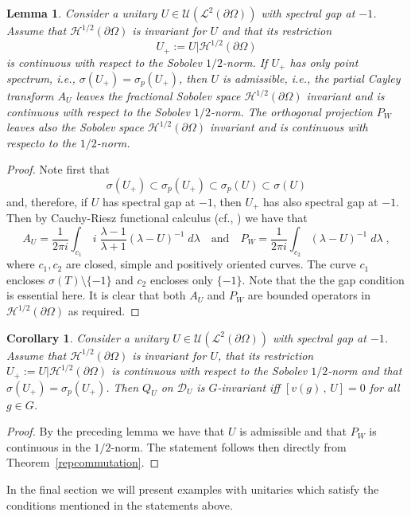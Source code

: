 \documentclass[a4paper,12pt]{amsart}
\renewcommand{\H}{\mathcal{H}}
\renewcommand{\L}{\mathcal{L}}
\newcommand{\D}{\mathcal{D}}
\newcommand{\pO}{{\partial \Omega}}
\newcommand{\1}{\mathbb{I}}
\newtheorem{corollary}[theorem]{Corollary}
\newtheorem{lemma}[theorem]{Lemma}
\numberwithin{equation}{section}
\numberwithin{theorem}{section}
\begin{document}
\begin{lemma}\label{lem:2}
Consider a unitary $U\in\mathcal{U}(\L^2(\pO))$ with spectral gap at $-1$. Assume that 
$\H^{1/2}(\pO)$ is invariant for $U$ and that its restriction
\[
 U_+:=U|\H^{1/2}(\pO)
\]
is continuous with respect to the Sobolev $1/2$-norm. If $U_+$ has only point spectrum, 
i.e., $\sigma(U_+)=\sigma_p(U_+)$, then $U$ is admissible, i.e., the partial Cayley transform
$A_U$ leaves the fractional Sobolev space $\H^{1/2}(\pO)$ invariant and is continuous with respect to the Sobolev $1/2$-norm.
The orthogonal projection $P_W$ leaves also the Sobolev space $\H^{1/2}(\pO)$ invariant and is continuous 
with respecto to the $1/2$-norm.
\end{lemma}
\begin{proof}
Note first that
\[
 \sigma(U_+)\subset\sigma_p(U_+)\subset\sigma_p(U)\subset \sigma(U)
\]
and, therefore, if $U$ has spectral gap at $-1$, then $U_+$ has also spectral gap at $-1$.
Then by Cauchy-Riesz functional calculus (cf., \cite[Chapter~VII]{DunfordI}) we have
that
\[
 A_U=\frac{1}{2\pi i}\int_{c_1}\,i\;\frac{\lambda-1}{\lambda+1}\left(\lambda-U\right)^{-1}\; d\lambda
 \quad\mathrm{and}\quad
 P_W=\frac{1}{2\pi i}\int_{c_2}\left(\lambda-U\right)^{-1}\; d\lambda\;,
\]
where $c_1, c_2$ are closed, simple and positively oriented curves. The curve $c_1$ encloses $\sigma(T)\setminus\{-1\}$ and
$c_2$ encloses only $\{-1\}$. Note that the the gap condition is essential here.
It is clear that both $A_U$ and $P_W$ are bounded operators in $\H^{1/2}(\pO)$ as required.
\end{proof}



\begin{corollary}\label{cor:2}
Consider a unitary $U\in\mathcal{U}(\L^2(\pO))$ with spectral gap at $-1$.
Assume that $\H^{1/2}(\pO)$ is invariant for $U$, that its restriction
$
 U_+:=U|\H^{1/2}(\pO)
$
is continuous with respect to the Sobolev $1/2$-norm and that
$\sigma(U_+)=\sigma_p(U_+)$. Then 
$Q_U$ on $\D_U$ is $G$-invariant iff $[v (g)\,,\,U]=0$ for all $g\in G$.
\end{corollary}
\begin{proof}
 By the preceding lemma we have that $U$ is admissible and that $P_W$ is continuous
in the $1/2$-norm. The statement follows then directly from Theorem~\ref{repcommutation}.
\end{proof}



In the final section we will present examples with unitaries which satisfy the conditions mentioned in the statements above.
\end{document}
